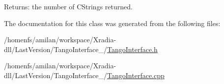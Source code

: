 \begin{Desc}
\item[Returns:]the number of CStrings returned. \end{Desc}


The documentation for this class was generated from the following files:\begin{CompactItemize}
\item 
/homenfs/amilan/workspace/Xradia-dll/LastVersion/TangoInterface\_/\hyperlink{TangoInterface_8h}{TangoInterface.h}\item 
/homenfs/amilan/workspace/Xradia-dll/LastVersion/TangoInterface\_/\hyperlink{TangoInterface_8cpp}{TangoInterface.cpp}\end{CompactItemize}
